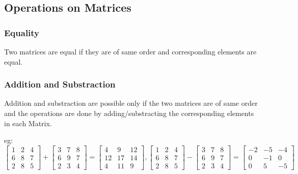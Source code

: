 \documentclass[12pt]{article}
\begin{document}
        \subsection*{Operations on Matrices}
        \subsubsection*{Equality}
        Two matrices are equal if they are of same order and corresponding elements are equal.
        \subsubsection*{Addition and Substraction}
        Addition and substraction are possible only if the two matrices are of same order and the operations are done by adding/substracting the corresponding elements in each Matrix.
        
        eg:$\begin{bmatrix}
            1 &2  &4\\
            6 & 8 & 7\\
            2 &8 &5
            \end{bmatrix}+\begin{bmatrix}
                3 &7  &8\\
                6 & 9 & 7\\
                2 &3 &4
                \end{bmatrix}=\begin{bmatrix}
                    4 &9  &12\\
                    12 & 17 & 14\\
                    4 &11 &9
                    \end{bmatrix}, \begin{bmatrix}
                        1 &2  &4\\
                        6 & 8 & 7\\
                        2 &8 &5
                        \end{bmatrix}-\begin{bmatrix}
                            3 &7  &8\\
                            6 & 9 & 7\\
                            2 &3 &4
                            \end{bmatrix}=\begin{bmatrix}
                                -2 &-5  &-4\\
                                0 & -1 & 0\\
                                0 &5 &-5
                                \end{bmatrix}$\\
\end{document}
